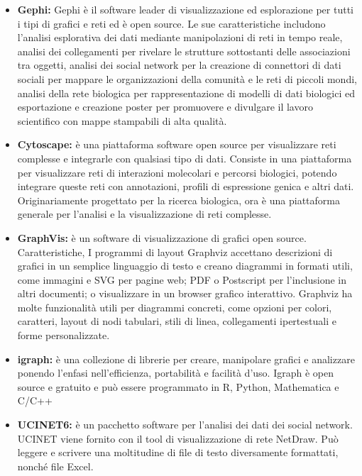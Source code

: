 \documentclass[binding=0.6cm]{sapthesis}
\begin{document}
\begin{itemize}
  \item \textbf{Gephi\cite{Gephi2024}:}
  Gephi è il software leader di visualizzazione ed esplorazione per tutti i tipi di grafici e reti ed è open source. Le sue caratteristiche includono
  l'analisi esplorativa dei dati mediante manipolazioni di reti in tempo reale, 
  analisi dei collegamenti per rivelare le strutture sottostanti delle associazioni tra oggetti, 
  analisi dei social network per la creazione di connettori di dati sociali per mappare le organizzazioni della comunità e le reti di piccoli mondi, 
  analisi della rete biologica per rappresentazione di modelli di dati biologici ed esportazione e 
  creazione poster per promuovere e divulgare il lavoro scientifico con mappe stampabili di alta qualità.
  \item \textbf{Cytoscape\cite{Cytoscape2024}:} è una piattaforma software open source per visualizzare 
  reti complesse e integrarle con qualsiasi tipo di dati. Consiste in una piattaforma per
  visualizzare reti di interazioni molecolari e percorsi biologici, potendo integrare queste reti con annotazioni,
  profili di espressione genica e altri dati. Originariamente progettato per la ricerca biologica, 
  ora è una piattaforma generale per l'analisi e la visualizzazione di reti complesse.
  \item \textbf{GraphVis\cite{Graphviz2024}:} è un software di visualizzazione di grafici open source. Caratteristiche,
  I programmi di layout Graphviz accettano descrizioni di grafici in un semplice linguaggio di testo e creano diagrammi in formati utili, 
  come immagini e SVG per pagine web; PDF o Postscript per l'inclusione in altri documenti; 
  o visualizzare in un browser grafico interattivo. Graphviz ha molte funzionalità utili 
  per diagrammi concreti, come opzioni per colori, caratteri, layout di nodi tabulari, stili di linea, 
  collegamenti ipertestuali e forme personalizzate.
  \item \textbf{igraph\cite{igraph2024}:} è una collezione di librerie per creare, manipolare grafici e analizzare ponendo l'enfasi nell'efficienza,
  portabilità e facilità d'uso. Igraph è open source e gratuito e può essere programmato in R, Python, Mathematica e C/C++
  \item \textbf{UCINET6\cite{UCINET2024}:} è un pacchetto software per l'analisi dei dati dei social network. UCINET viene fornito con il tool di visualizzazione di rete NetDraw.
  Può leggere e scrivere una moltitudine di file di testo diversamente formattati, nonché file Excel. 

\end{itemize}
\end{document}

